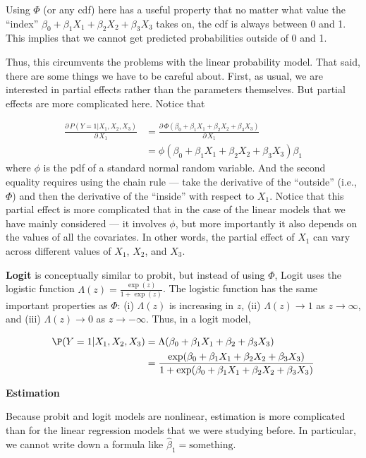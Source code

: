 \documentclass[
  letterpaper,
  DIV=11,
  numbers=noendperiod]{scrreprt}
\begin{document}
Using \(\Phi\) (or any cdf) here has a useful property that no matter
what value the ``index''
\(\beta_0 + \beta_1 X_1 + \beta_2 X_2 + \beta_3 X_3\) takes on, the cdf
is always between 0 and 1. This implies that we cannot get predicted
probabilities outside of 0 and 1.

Thus, this circumvents the problems with the linear probability model.
That said, there are some things we have to be careful about. First, as
usual, we are interested in partial effects rather than the parameters
themselves. But partial effects are more complicated here. Notice that

\[
  \begin{aligned}
  \frac{ \partial \, P(Y=1|X_1,X_2,X_3)}{\partial \, X_1} &= \frac{\partial \, \Phi(\beta_0 + \beta_1 X_1 + \beta_2 X_2 + \beta_3 X_3)}{\partial \, X_1} \\
  &= \phi(\beta_0 + \beta_1 X_1 + \beta_2 X_2 + \beta_3 X_3) \beta_1
  \end{aligned}
\] where \(\phi\) is the pdf of a standard normal random variable. And
the second equality requires using the chain rule --- take the
derivative of the ``outside'' (i.e., \(\Phi\)) and then the derivative
of the ``inside'' with respect to \(X_1\). Notice that this partial
effect is more complicated that in the case of the linear models that we
have mainly considered --- it involves \(\phi\), but more importantly it
also depends on the values of all the covariates. In other words, the
partial effect of \(X_1\) can vary across different values of \(X_1\),
\(X_2\), and \(X_3\).

\textbf{Logit} is conceptually similar to probit, but instead of using
\(\Phi\), Logit uses the logistic function
\(\Lambda(z) = \frac{\exp(z)}{1+\exp(z)}\). The logistic function has
the same important properties as \(\Phi\): (i) \(\Lambda(z)\) is
increasing in \(z\), (ii) \(\Lambda(z) \rightarrow 1\) as
\(z \rightarrow \infty\), and (iii) \(\Lambda(z) \rightarrow 0\) as
\(z \rightarrow -\infty\). Thus, in a logit model,

\[
  \begin{aligned}
  \P(Y=1 | X_1, X_2, X_3) &= \Lambda(\beta_0 + \beta_1 X_1 + \beta_2 + \beta_3 X_3) \\
  &= \frac{\exp(\beta_0 + \beta_1 X_1 + \beta_2 X_2 + \beta_3 X_3)}{1+\exp(\beta_0 + \beta_1 X_1 + \beta_2 X_2 + \beta_3 X_3)}
  \end{aligned}
\]

\textbf{Estimation}

Because probit and logit models are nonlinear, estimation is more
complicated than for the linear regression models that we were studying
before. In particular, we cannot write down a formula like
\(\hat{\beta}_1 = \textrm{something}\).
\end{document}
